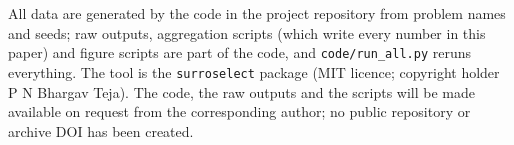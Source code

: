 All data are generated by the code in the project repository from problem names and seeds; raw outputs, aggregation scripts (which write every number in this paper) and figure scripts are part of the code, and \texttt{code/run\_all.py} reruns everything. The tool is the \texttt{surroselect} package (MIT licence; copyright holder P N Bhargav Teja). The code, the raw outputs and the scripts will be made available on request from the corresponding author; no public repository or archive DOI has been created.
